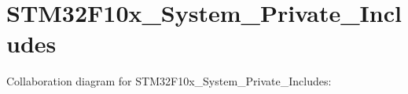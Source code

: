 \section{S\+T\+M32\+F10x\+\_\+\+System\+\_\+\+Private\+\_\+\+Includes}
\label{group___s_t_m32_f10x___system___private___includes}
Collaboration diagram for S\+T\+M32\+F10x\+\_\+\+System\+\_\+\+Private\+\_\+\+Includes\+:
